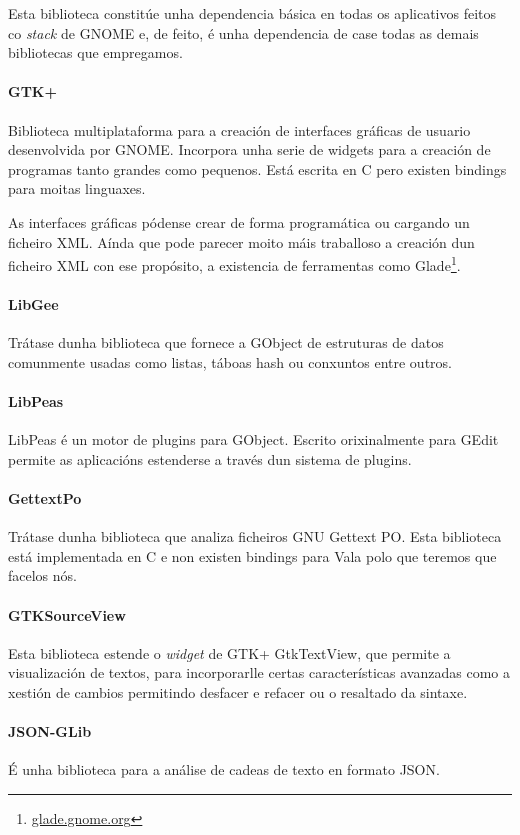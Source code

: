 Esta biblioteca constitúe unha dependencia básica en todas os aplicativos feitos co \emph{stack} de GNOME e, de feito, é unha dependencia de case todas as demais bibliotecas que empregamos.

\paragraph{GTK+} Biblioteca multiplataforma para a creación de interfaces gráficas de usuario desenvolvida por GNOME. Incorpora unha serie de widgets para a creación de programas tanto grandes como pequenos. Está escrita en C pero existen bindings para moitas linguaxes.

As interfaces gráficas pódense crear de forma programática ou cargando un ficheiro XML. Aínda que pode parecer moito máis traballoso a creación dun ficheiro XML con ese propósito, a existencia de ferramentas como Glade\footnote{\href{http://glade.gnome.org}{glade.gnome.org}}.

\paragraph{LibGee} Trátase dunha biblioteca que fornece a GObject de estruturas de datos comunmente usadas como listas, táboas hash ou conxuntos entre outros.

\paragraph{LibPeas} LibPeas é un motor de plugins para GObject. Escrito orixinalmente para GEdit permite as aplicacións estenderse a través dun sistema de plugins.

\paragraph{GettextPo} Trátase dunha biblioteca que analiza ficheiros GNU Gettext PO. Esta biblioteca está implementada en C e non existen bindings para Vala polo que teremos que facelos nós.

\paragraph{GTKSourceView} Esta biblioteca estende o \emph{widget} de GTK+ GtkTextView, que permite a visualización de textos, para incorporarlle certas características avanzadas como a xestión de cambios permitindo desfacer e refacer ou o resaltado da sintaxe.

\paragraph{JSON-GLib} É unha biblioteca para a análise de cadeas de texto en formato JSON.

